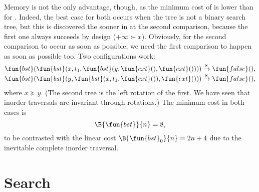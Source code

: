 Memory is not the only advantage, though, as the minimum cost of
 is lower than for
. Indeed, the best case
for both occurs when the tree is not a binary search tree, but this is
discovered the sooner in  at the second comparison, because
the first one always succeeds by design (\(+\infty \succ
x\)). Obviously, for the second comparison to occur as soon as
possible, we need the first comparison to happen as soon as possible
too. Two configurations work:
\begin{align*}
\fun{bst}(\fun{bst}(x,t_1,\fun{bst}(y,\fun{ext}(),\fun{ext}())))
& \xrightarrow{\smash{8}} \fun{false}(),\\
\fun{bst}(\fun{bst}(y,\fun{bst}(x,t_1,\fun{ext}()),\fun{ext}()))
& \xrightarrow{\smash{8}} \fun{false}(),
\end{align*}
where \(x \succcurlyeq y\). (The second tree is the left rotation of
the first. We have seen  that inorder
traversals are invariant through rotations.) The minimum cost in both
cases is
\begin{equation*}
  \B{\fun{bst}}{n} = 8,
  \index{bst@$\B{\fun{bst}}{n}$}
\end{equation*}
to be contrasted with the linear cost \(\B{\fun{bst}_0}{n} = 2n +
4\) due to the inevitable complete
inorder traversal.

\section{Search}


